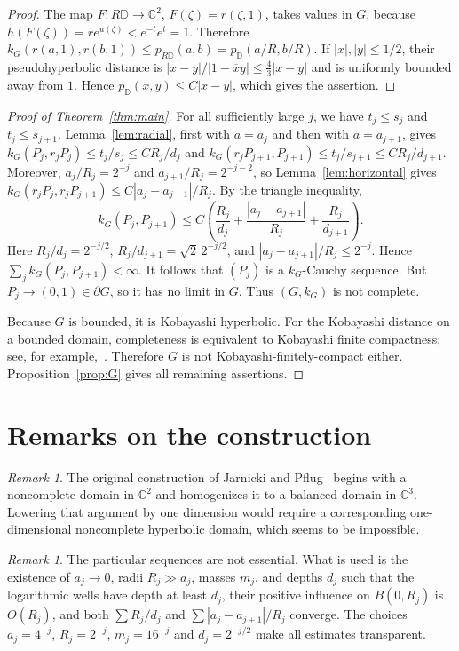 \documentclass{amsart}
\newcommand{\C}{\mathbb C}
\newcommand{\D}{\mathbb D}
\theoremstyle{remark}
\newtheorem{remark}[theorem]{Remark}
\begin{document}
\begin{proof}
The map $F:R\D\to\C^2$, $F(\zeta)=r(\zeta,1)$, takes values in $G$, because $h(F(\zeta))=re^{u(\zeta)}<e^{-t}e^t=1$. Therefore $k_G(r(a,1),r(b,1))\le p_{R\D}(a,b)=p_{\D}(a/R,b/R)$. If $|x|,|y|\le1/2$, their pseudohyperbolic distance is $|x-y|/|1-\overline{x}y|\le\frac43|x-y|$ and is uniformly bounded away from $1$. Hence $p_{\D}(x,y)\le C|x-y|$, which gives the assertion.
\end{proof}

\begin{proof}[Proof of Theorem~\ref{thm:main}]
For all sufficiently large $j$, we have $t_j\le s_j$ and $t_j\le s_{j+1}$. Lemma~\ref{lem:radial}, first with $a=a_j$ and then with $a=a_{j+1}$, gives $k_G(P_j,r_jP_j)\le t_j/s_j\le C R_j/d_j$ and $k_G(r_jP_{j+1},P_{j+1})\le t_j/s_{j+1}\le C R_j/d_{j+1}$. Moreover, $a_j/R_j=2^{-j}$ and $a_{j+1}/R_j=2^{-j-2}$, so Lemma~\ref{lem:horizontal} gives $k_G(r_jP_j,r_jP_{j+1})\le C|a_j-a_{j+1}|/R_j$. By the triangle inequality,
\[
 k_G(P_j,P_{j+1})\le C\left(
 \frac{R_j}{d_j}+\frac{|a_j-a_{j+1}|}{R_j}+\frac{R_j}{d_{j+1}}
 \right).
\]
Here $R_j/d_j=2^{-j/2}$, $R_j/d_{j+1}=\sqrt2\,2^{-j/2}$, and $|a_j-a_{j+1}|/R_j\le2^{-j}$. Hence $\sum_jk_G(P_j,P_{j+1})<\infty$. It follows that $(P_j)$ is a $k_G$-Cauchy sequence. But $P_j\to(0,1)\in\partial G$, so it has no limit in $G$. Thus $(G,k_G)$ is not complete.

Because $G$ is bounded, it is Kobayashi hyperbolic. For the Kobayashi distance on a bounded domain, completeness is equivalent to Kobayashi finite compactness; see, for example,~\cite{JPbook1,JPbook2}. Therefore $G$ is not Kobayashi-finitely-compact either. Proposition~\ref{prop:G} gives all remaining assertions.
\end{proof}

\section{Remarks on the construction}

\begin{remark}
The original construction of Jarnicki and Pflug~\cite{JPcounterexample} begins with a noncomplete domain in $\C^2$ and homogenizes it to a balanced domain in $\C^3$. Lowering that argument by one dimension would require a corresponding one-dimensional noncomplete hyperbolic domain, which seems to be impossible.
\end{remark}

\begin{remark}
The particular sequences are not essential. What is used is the existence of $a_j\to0$, radii $R_j\gg a_j$, masses $m_j$, and depths $d_j$ such that the logarithmic wells have depth at least $d_j$, their positive influence on $B(0,R_j)$ is $O(R_j)$, and both $\sum R_j/d_j$ and $\sum |a_j-a_{j+1}|/R_j$ converge. The choices $a_j=4^{-j}$, $R_j=2^{-j}$, $m_j=16^{-j}$ and $d_j=2^{-j/2}$ make all estimates transparent.
\end{remark}
\end{document}

